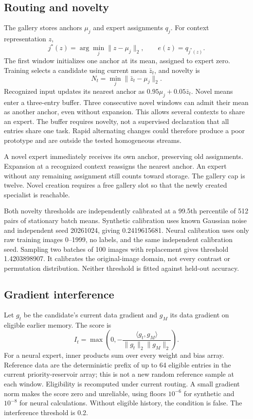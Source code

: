 \subsection{Routing and novelty}
The gallery stores anchors \(\mu_j\) and expert assignments \(q_j\). For context representation \(z\),
\begin{equation}
j^*(z)=\arg\min_j\|z-\mu_j\|_2,\qquad e(z)=q_{j^*(z)}.
\end{equation}
The first window initializes one anchor at its mean, assigned to expert zero. Training selects a candidate using current mean \(\bar z_t\), and novelty is
\begin{equation}
N_t=\min_j\|\bar z_t-\mu_j\|_2.
\end{equation}
Recognized input updates its nearest anchor as \(0.95\mu_j+0.05\bar z_t\). Novel means enter a three-entry buffer. Three consecutive novel windows can admit their mean as another anchor, even without expansion. This allows several contexts to share an expert. The buffer requires novelty, not a supervised declaration that all entries share one task. Rapid alternating changes could therefore produce a poor prototype and are outside the tested homogeneous streams.

A novel expert immediately receives its own anchor, preserving old assignments. Expansion at a recognized context reassigns the nearest anchor. An expert without any remaining assignment still counts toward storage. The gallery cap is twelve. Novel creation requires a free gallery slot so that the newly created specialist is reachable.

Both novelty thresholds are independently calibrated at a 99.5th percentile of 512 pairs of stationary batch means. Synthetic calibration uses known Gaussian noise and independent seed 20261024, giving 0.2419615681. Neural calibration uses only raw training images 0--1999, no labels, and the same independent calibration seed. Sampling two batches of 100 images with replacement gives threshold 1.4203898907. It calibrates the original-image domain, not every contrast or permutation distribution. Neither threshold is fitted against held-out accuracy.

\subsection{Gradient interference}
Let \(g_t\) be the candidate's current data gradient and \(g_M\) its data gradient on eligible earlier memory. The score is
\begin{equation}
I_t=\max\left(0,-\frac{\langle g_t,g_M\rangle}{\|g_t\|_2\|g_M\|_2}\right).
\end{equation}
For a neural expert, inner products sum over every weight and bias array. Reference data are the deterministic prefix of up to 64 eligible entries in the current priority-reservoir array; this is not a new random reference sample at each window. Eligibility is recomputed under current routing. A small gradient norm makes the score zero and unreliable, using floors \(10^{-6}\) for synthetic and \(10^{-8}\) for neural calculations. Without eligible history, the condition is false. The interference threshold is 0.2.

